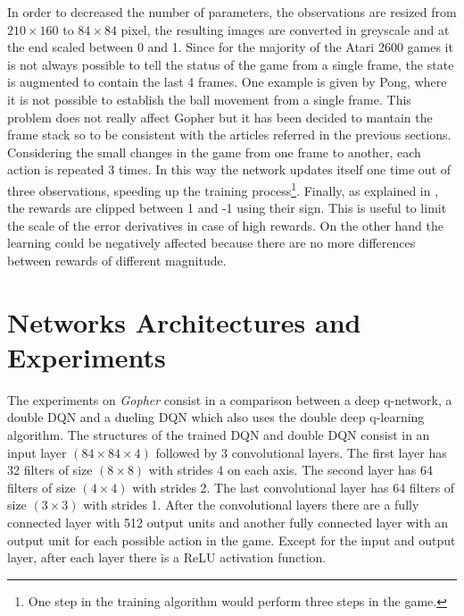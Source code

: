 \documentclass[article,11pt]{article}
\begin{document}
	In order to decreased the number of parameters, the observations are resized from $210\times160$ to $84\times84$ pixel, the resulting images are converted in greyscale and at the end scaled between 0 and 1.
	Since for the majority of the Atari 2600 games it is not always possible to tell the status of the game from a single frame, the state is augmented to contain the last 4 frames. One example is given by Pong, where it is not possible to establish the ball movement from a single frame. This problem does not really affect Gopher but it has been decided to mantain the frame stack so to be consistent with the articles referred in the previous sections.
	Considering the small changes in the game from one frame to another, each action is repeated 3 times. In this way the network updates itself one time out of three observations, speeding up the training process\footnote{One step in the training algorithm would perform three steps in the game.}.
	Finally, as explained in \cite{dqn2013}, the rewards are clipped between 1 and -1 using their sign. This is useful to limit the scale of the error derivatives in case of high rewards. On the other hand the learning could be negatively affected because there are no more differences between rewards of different magnitude.
	
	
	\section{Networks Architectures and Experiments}
	The experiments on \textit{Gopher} consist in a comparison between a deep q-network, a double DQN and a dueling DQN which also uses the double deep q-learning algorithm. The structures of the trained DQN and double DQN consist in an input layer $(84\times84\times4)$ followed by 3 convolutional layers. The first layer has 32 filters of size $(8\times8)$ with strides 4 on each axis. The second layer has 64 filters of size $(4\times4)$ with strides 2. The last convolutional layer has 64 filters  of size $(3\times3)$ with strides 1. After the convolutional layers there are a fully connected layer with 512 output units and another fully connected layer with an output unit for each possible action in the game. Except for the input and output layer, after each layer there is a ReLU activation function.
	
\end{document}

